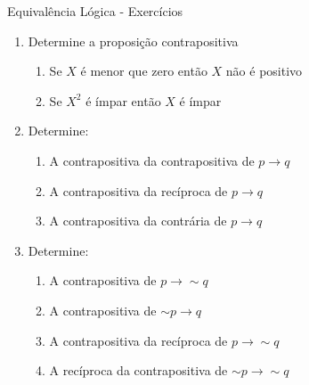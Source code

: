 \begin{frame}[t]{Equivalência Lógica - Exercícios} %
	\begin{enumerate}
	\item Determine a proposição contrapositiva
	\begin{enumerate}
	\item Se $X$ é menor que zero então $X$ não é positivo
	\item Se $X^2$ é ímpar então $X$ é ímpar
	\end{enumerate}

	\item Determine:
	\begin{enumerate}
	\item A contrapositiva da contrapositiva de $p \rightarrow q$
	\item A contrapositiva da recíproca de $p \rightarrow q$
	\item A contrapositiva da contrária de $p \rightarrow q$
	\end{enumerate}

	\item Determine:
	\begin{enumerate}
	\item A contrapositiva de $p \rightarrow \sim q$
	\item A contrapositiva de $\sim p \rightarrow q$
	\item A contrapositiva da recíproca de $p \rightarrow \sim q$
	\item A recíproca da contrapositiva de $\sim p \rightarrow \sim q$
	\end{enumerate}

	\end{enumerate}
\end{frame}

